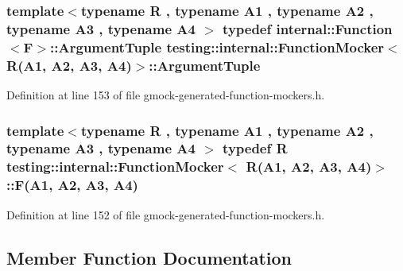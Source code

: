 \subsubsection[{\texorpdfstring{Argument\+Tuple}{ArgumentTuple}}]{\setlength{\rightskip}{0pt plus 5cm}template$<$typename R , typename A1 , typename A2 , typename A3 , typename A4 $>$ typedef {\bf internal\+::\+Function}$<${\bf F}$>$\+::{\bf Argument\+Tuple} {\bf testing\+::internal\+::\+Function\+Mocker}$<$ {\bf R}(A1, A2, A3, A4)$>$\+::{\bf Argument\+Tuple}}\hypertarget{classtesting_1_1internal_1_1_function_mocker_3_01_r_07_a1_00_01_a2_00_01_a3_00_01_a4_08_4_a97576d71dfe85cbb0fc51fcaad6d4cc1}{}\label{classtesting_1_1internal_1_1_function_mocker_3_01_r_07_a1_00_01_a2_00_01_a3_00_01_a4_08_4_a97576d71dfe85cbb0fc51fcaad6d4cc1}


Definition at line 153 of file gmock-\/generated-\/function-\/mockers.\+h.

\subsubsection[{\texorpdfstring{F}{F}}]{\setlength{\rightskip}{0pt plus 5cm}template$<$typename R , typename A1 , typename A2 , typename A3 , typename A4 $>$ typedef {\bf R} {\bf testing\+::internal\+::\+Function\+Mocker}$<$ {\bf R}(A1, A2, A3, A4)$>$\+::F(A1, A2, A3, A4)}\hypertarget{classtesting_1_1internal_1_1_function_mocker_3_01_r_07_a1_00_01_a2_00_01_a3_00_01_a4_08_4_a9be04bb962edb1458c857ca8e9db9318}{}\label{classtesting_1_1internal_1_1_function_mocker_3_01_r_07_a1_00_01_a2_00_01_a3_00_01_a4_08_4_a9be04bb962edb1458c857ca8e9db9318}


Definition at line 152 of file gmock-\/generated-\/function-\/mockers.\+h.



\subsection{Member Function Documentation}
